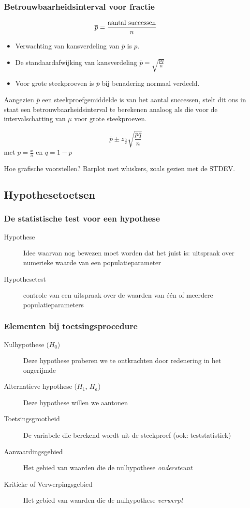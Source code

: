 \begin{frame}
	\frametitle{Betrouwbaarheidsinterval voor fractie}
	\[ \overline{p} = \frac{\textnormal{aantal successen}}{n} \]
	\begin{itemize}
		\item Verwachting van kansverdeling van $\overline{p}$ is $p$.
		\item De standaardafwijking van kansverdeling $\overline{p} = \sqrt{\frac{pq}{n}}$
		\item Voor grote steekproeven is $\overline{p}$ bij benadering normaal verdeeld.
	\end{itemize}
	Aangezien $\overline{p}$ een steekproefgemiddelde is van het aantal successen, stelt dit ons in staat een betrouwbaarheidsinterval te berekenen analoog als die voor de intervalschatting van $\mu$ voor grote steekproeven.
	
	
	\[ \overline{p} \pm z_{\frac{\alpha}{2}} \sqrt{\frac{\overline{p}\overline{q}}{n}} \]
	met $\overline{p} = \frac{x}{n}$ en $\overline{q} = 1- \overline{p}$

\end{frame}

\begin{frame}{Hoe grafische voorstellen?}
	Barplot met whiskers, zoals gezien met de STDEV.
\end{frame}

\subsection{Hypothesetoetsen}
\begin{frame}
	\frametitle{De statistische test voor een hypothese}
	
	\begin{description}
		\item[Hypothese] Idee waarvan nog bewezen moet worden dat het juist is: uitspraak over numerieke waarde van een populatieparameter
		\item[Hypothesetest] controle van een uitspraak over de waarden van één of meerdere populatieparameters
	\end{description}
\end{frame}

\begin{frame}
	\frametitle{Elementen bij toetsingsprocedure}
	
	\begin{description}
		\item[Nulhypothese ($H_0$)] Deze hypothese proberen we te ontkrachten door redenering in het ongerijmde
		\item[Alternatieve hypothese ($H_1$, $H_a$)] Deze hypothese willen we aantonen
		\item[Toetsingsgrootheid] De variabele die berekend wordt uit de steekproef (ook: teststatistiek)
		\item[Aanvaardingsgebied] Het gebied van waarden die de nulhypothese \emph{ondersteunt}
		\item[Kritieke of Verwerpingsgebied] Het gebied van waarden die de nulhypothese \emph{verwerpt}
	\end{description}
\end{frame}

